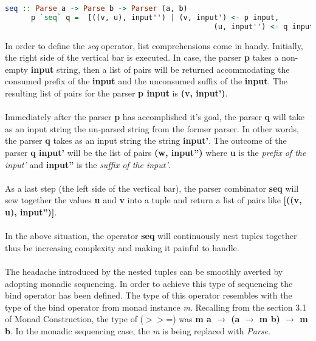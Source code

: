 \documentclass[a4paper, onecolumn]{article}
\begin{document}
    \begin{tcolorbox}
    
    \begin{lstlisting}[language=Haskell]
      seq :: Parse a -> Parse b -> Parser (a, b)
      p `seq` q =  [((v, u), input'') | (v, input') <- p input,
                                                (u, input'') <- q input']
    \end{lstlisting}
    \end{tcolorbox}
    
    In order to define the \textit{seq} operator, list comprehensions come in handy. Initially, the right side of the vertical bar is executed. In case, the parser \textbf{p} takes a non-empty \textbf{input} string, then a list of pairs will be returned accommodating the consumed prefix of the \textbf{input} and the unconsumed suffix of the \textbf{input}. The resulting list of pairs for the parser \textbf{p input} is \textbf{(v, input')}. \\ \\ Immediately after the parser \textbf{p} has accomplished it's goal, the parser \textbf{q} will take as an input string the un-parsed string from the former parser. In other words, the parser \textbf{q} takes as an input string the string \textbf{input'}. The outcome of the parser \textbf{q input'} will be the list of pairs \textbf{(w, input'')} where \textbf{u} is the \textit{prefix of the input'} and \textbf{input''} is the \textit{suffix of the input'}. \\ \\
    As a last step (the left side of the vertical bar), the parser combinator \textbf{seq} will sew together the values \textbf{u} and \textbf{v} into a tuple and return a list of pairs like \textbf{[((v, u), input'')]}. \\ \\
    In the above situation, the operator \textbf{seq} will continuously nest tuples together thus be increasing complexity and making it painful to handle. \\ \\
    The headache introduced by the nested tuples can be smoothly averted by adopting monadic sequencing. In order to achieve this type of sequencing the bind operator has been defined. The type of this operator resembles with the type of the bind operator from monad instance \textit{m}. Recalling from the section 3.1 of Monad Construction, the type of ($>>$=) was {\textbf{m a $\rightarrow$ (a $\rightarrow$ m b) $\rightarrow$ m b}}. In the monadic sequencing case, the \textit{m} is being replaced with \textit{Parse}.
    
\end{document}
